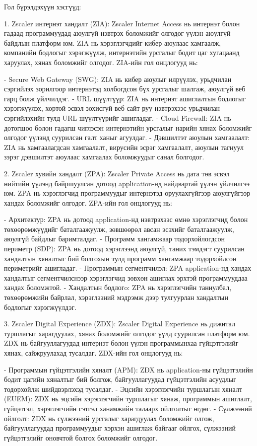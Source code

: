 					Гол бүрэлдэхүүн хэсгүүд:
					
					1. Zscaler интернэт хандалт (ZIA): Zscaler Internet Access нь интернэт болон гадаад программуудад аюулгүй нэвтрэх боломжийг олгодог үүлэн аюулгүй байдлын платформ юм. ZIA нь хэрэглэгчдийг кибер аюулаас хамгаалж, компанийн бодлогыг хэрэгжүүлж, интернэтийн урсгалыг бодит цаг хугацаанд харуулах, хянах боломжийг олгодог. ZIA-ийн гол онцлогууд нь:
					
							- Secure Web Gateway (SWG): ZIA нь кибер аюулыг илрүүлэх, урьдчилан сэргийлэх зорилгоор интернэтэд холбогдсон бүх урсгалыг шалгаж, аюулгүй веб гарц болж үйлчилдэг.
							- URL шүүлтүүр: ZIA нь интернэт ашиглалтын бодлогыг хэрэгжүүлэх, хортой эсвэл зохисгүй веб сайт руу нэвтрэхээс урьдчилан сэргийлэхийн тулд URL шүүлтүүрийг ашигладаг.
							- Cloud Firewall: ZIA нь дотогшоо болон гадагш чиглэсэн интернэтийн урсгалыг нарийн хянах боломжийг олгодог үүлэнд суурилсан галт ханыг агуулдаг.
							- Дэвшилтэт аюулын хамгаалалт: ZIA нь хамгаалагдсан хамгаалалт, вирусийн эсрэг хамгаалалт, аюулын тагнуул зэрэг дэвшилтэт аюулаас хамгаалах боломжуудыг санал болгодог.
					
					2. Zscaler хувийн хандалт (ZPA): Zscaler Private Access нь дата төв эсвэл нийтийн үүлэнд байршуулсан дотоод application-нд найдвартай үүлэн үйлчилгээ юм. ZPA нь хэрэглэгчид программуудыг интернэтэд оруулахгүйгээр аюулгүйгээр хандах боломжийг олгодог. ZPA-ийн гол онцлогууд нь:
					
							- Архитектур: ZPA нь дотоод application-нд нэвтрэхээс өмнө хэрэглэгчид болон төхөөрөмжүүдийг баталгаажуулж, зөвшөөрөл авсан эсэхийг баталгаажуулж, аюулгүй байдлыг баримталдаг.
							- Программ хангамжаар тодорхойлогдсон периметр (SDP): ZPA нь дотоод хэрэглээнд аюулгүй, таних тэмдэгт суурилсан хандалтын хяналтыг бий болгохын тулд программ хангамжаар тодорхойлсон периметрийг ашигладаг.
							- Программын сегментчилэл: ZPA application-нд хандах хандалтыг сегментчилснээр хэрэглэгчид зөвхөн ашиглах эрхтэй программууддаа хандах боломжтой.
							- Хандалтын бодлогo: ZPA нь хэрэглэгчийн таниулбал, төхөөрөмжийн байрлал, хэрэглээний мэдрэмж дээр тулгуурлан хандалтын бодлогыг хэрэгжүүлдэг.
					
					3. Zscaler Digital Experience (ZDX): Zscaler Digital Experience нь дижитал туршлагыг харагдуулах, хянах боломжийг олгодог үүлд суурилсан платформ юм. ZDX нь байгууллагуудад интернэт болон үүлэн программынхаа гүйцэтгэлийг хянах, сайжруулахад тусалдаг. ZDX-ийн гол онцлогууд нь:
					
							- Программын гүйцэтгэлийн хяналт (APM): ZDX нь application-ны гүйцэтгэлийн бодит цагийн хяналтыг бий болгож, байгууллагуудад гүйцэтгэлийн асуудлыг тодорхойлж шийдвэрлэхэд тусалдаг.
							- Эцсийн хэрэглэгчийн туршлагын хяналт (EUEM): ZDX нь эцсийн хэрэглэгчийн туршлагыг хянаж, программын ашиглалт, гүйцэтгэл, хэрэглэгчийн сэтгэл ханамжийн талаарх ойлголтыг өгдөг.
							- Сүлжээний ойлголт: ZDX нь сүлжээний урсгалыг харагдуулах боломжийг олгож, байгууллагуудад программуудыг хэрхэн ашиглаж байгааг ойлгох, сүлжээний гүйцэтгэлийг оновчтой болгох боломжийг олгодог.
					
